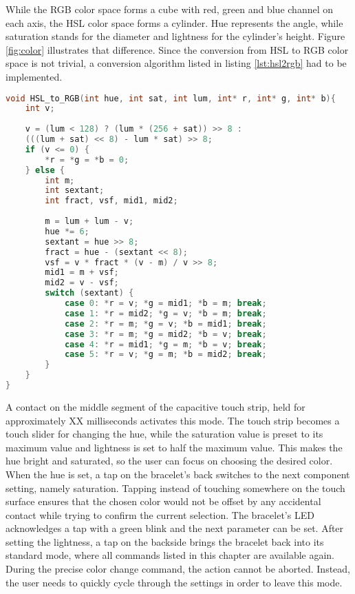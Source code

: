 
While the RGB color space forms a cube with red, green and blue channel on each axis, the \ac{HSL} color space forms a cylinder. Hue represents the angle, while saturation stands for the diameter and lightness for the cylinder's height. Figure \ref{fig:color} illustrates that difference. Since the conversion from \ac{HSL} to RGB color space is not trivial, a conversion algorithm listed in listing \ref{lst:hsl2rgb} had to be implemented.

\begin{lstlisting}[label=lst:resample,language=c,frame=lt,caption=Converting from the RGB color space to the \ac{HSL} color space]
void HSL_to_RGB(int hue, int sat, int lum, int* r, int* g, int* b){
	int v;
	
	v = (lum < 128) ? (lum * (256 + sat)) >> 8 :
	(((lum + sat) << 8) - lum * sat) >> 8;
	if (v <= 0) {
		*r = *g = *b = 0;
	} else {
		int m;
		int sextant;
		int fract, vsf, mid1, mid2;
		
		m = lum + lum - v;
		hue *= 6;
		sextant = hue >> 8;
		fract = hue - (sextant << 8);
		vsf = v * fract * (v - m) / v >> 8;
		mid1 = m + vsf;
		mid2 = v - vsf;
		switch (sextant) {
			case 0: *r = v; *g = mid1; *b = m; break;
			case 1: *r = mid2; *g = v; *b = m; break;
			case 2: *r = m; *g = v; *b = mid1; break;
			case 3: *r = m; *g = mid2; *b = v; break;
			case 4: *r = mid1; *g = m; *b = v; break;
			case 5: *r = v; *g = m; *b = mid2; break;
		}
	}
}
\end{lstlisting}

A contact on the middle segment of the capacitive touch strip, held for approximately XX milliseconds activates this mode. The touch strip becomes a touch slider for changing the hue, while the saturation value is preset to its maximum value and lightness is set to half the maximum value. This makes the hue bright and saturated, so the user can focus on choosing the desired color. When the hue is set, a tap on the bracelet's back switches to the next component setting, namely saturation. Tapping instead of touching somewhere on the touch surface ensures that the chosen color would not be offset by any accidental contact while trying to confirm the current selection. The bracelet's \ac{LED} acknowledges a tap with a green blink and the next parameter can be set. After setting the lightness, a tap on the backside brings the bracelet back into its standard mode, where all commands listed in this chapter are available again. During the precise color change command, the action cannot be aborted. Instead, the user needs to quickly cycle through the settings in order to leave this mode.

